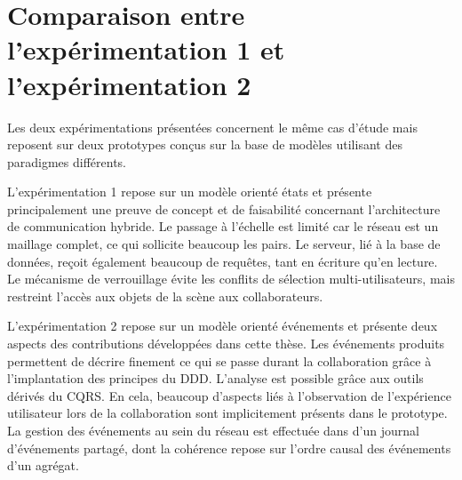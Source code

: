 \section{Comparaison entre l'expérimentation 1 et l'expérimentation 2}

Les deux expérimentations présentées concernent le même cas d'étude mais 
reposent sur deux prototypes conçus sur la base de modèles utilisant des 
paradigmes différents. 

L'expérimentation 1 repose sur un modèle orienté états et présente principalement 
une preuve de concept et de faisabilité concernant l'architecture de communication 
hybride. Le passage à l'échelle est limité car le réseau est un maillage 
complet, ce qui sollicite beaucoup les pairs. Le serveur, lié à la base de données, 
reçoit également beaucoup de requêtes, tant en écriture qu'en lecture. Le 
mécanisme de verrouillage évite les conflits de sélection multi-utilisateurs, mais 
restreint l'accès aux objets de la scène aux collaborateurs. 


L'expérimentation 2 repose sur un modèle orienté événements et présente deux 
aspects des contributions développées dans cette thèse. Les événements 
produits permettent de décrire finement ce qui se passe durant la 
collaboration grâce à l'implantation des principes du \gls{DDD}. L'analyse est 
possible grâce aux outils dérivés du \gls{CQRS}. En cela, beaucoup d'aspects liés 
à l'observation de l'expérience utilisateur lors de la collaboration sont implicitement 
présents dans le prototype. La gestion des événements au sein du réseau est 
effectuée dans d'un journal d'événements 
partagé, dont la cohérence repose sur l'ordre causal des événements d'un 
agrégat.


